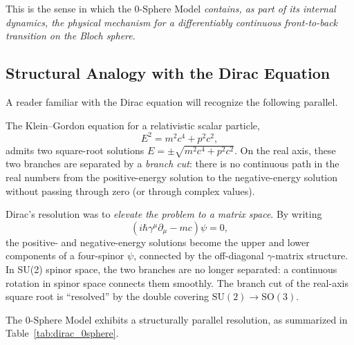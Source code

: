 \documentclass[%
 reprint,
 amsmath,amssymb,
 aps,
 prb,
]{revtex4-2}
\numberwithin{equation}{section}
\theoremstyle{definition}
\theoremstyle{remark}
\begin{document}
This is the sense in which the 0-Sphere Model \emph{contains, as part of its internal dynamics, the physical mechanism for a differentiably continuous front-to-back transition on the Bloch sphere}.

\subsection{Structural Analogy with the Dirac Equation}

A reader familiar with the Dirac equation will recognize the following parallel.

The Klein--Gordon equation for a relativistic scalar particle,
\begin{equation}
E^2 = m^2c^4 + p^2c^2,
\end{equation}
admits two square-root solutions $E = \pm\sqrt{m^2c^4 + p^2c^2}$. On the real axis, these two branches are separated by a \emph{branch cut}: there is no continuous path in the real numbers from the positive-energy solution to the negative-energy solution without passing through zero (or through complex values).

Dirac's resolution was to \emph{elevate the problem to a matrix space}. By writing
\begin{equation}
(i\hbar\gamma^\mu\partial_\mu - mc)\psi = 0,
\end{equation}
the positive- and negative-energy solutions become the upper and lower components of a four-spinor $\psi$, connected by the off-diagonal $\gamma$-matrix structure. In SU(2) spinor space, the two branches are no longer separated: a continuous rotation in spinor space connects them smoothly. The branch cut of the real-axis square root is ``resolved'' by the double covering $\mathrm{SU}(2) \to \mathrm{SO}(3)$.

The 0-Sphere Model exhibits a structurally parallel resolution, as summarized in Table~\ref{tab:dirac_0sphere}.
\end{document}
